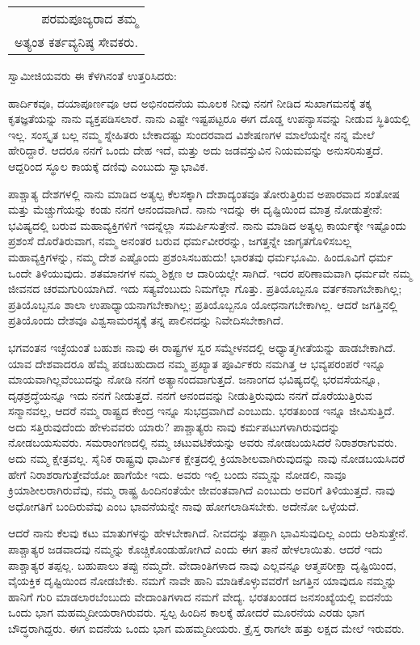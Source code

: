 \begin{longtable}[r]{@{}r@{}}
ಪರಮಪೂಜ್ಯರಾದ ತಮ್ಮ \\
ಅತ್ಯಂತ ಕರ್ತವ್ಯನಿಷ್ಠ ಸೇವಕರು. \\
\end{longtable}

ಸ್ವಾಮೀಜಿಯವರು ಈ ಕೆಳಗಿನಂತೆ ಉತ್ತರಿಸಿದರು:

ಹಾರ್ದಿಕವೂ, ದಯಾಪೂರ್ಣವೂ ಆದ ಅಭಿನಂದನೆಯ ಮೂಲಕ ನೀವು ನನಗೆ ನೀಡಿದ ಸುಖಾಗಮನಕ್ಕೆ ತಕ್ಕ ಕೃತಜ್ಞತೆಯನ್ನು ನಾನು ವ್ಯಕ್ತಪಡಿಸಲಾರೆ. ನಾನು ಎಷ್ಟೇ ಇಷ್ಟಪಟ್ಟರೂ ಈಗ ದೊಡ್ಡ ಉಪನ್ಯಾಸವನ್ನು ನೀಡುವ ಸ್ಥಿತಿಯಲ್ಲಿ ಇಲ್ಲ. ಸಂಸ್ಕೃತ ಬಲ್ಲ ನಮ್ಮ ಸ್ನೇಹಿತರು ಬೇಕಾದಷ್ಟು ಸುಂದರವಾದ ವಿಶೇಷಣಗಳ ಮಾಲೆಯನ್ನೇ ನನ್ನ ಮೇಲೆ ಹೇರಿದ್ದಾರೆ. ಆದರೂ ನನಗೆ ಒಂದು ದೇಹ ಇದೆ, ಮತ್ತು ಅದು ಜಡವಸ್ತುವಿನ ನಿಯಮವನ್ನು ಅನುಸರಿಸುತ್ತದೆ. ಆದ್ದರಿಂದ ಸ್ಥೂಲ ಕಾಯಕ್ಕೆ ದಣಿವು ಎಂಬುದು ಸ್ವಾಭಾವಿಕ. 

ಪಾಶ್ಚಾತ್ಯ ದೇಶಗಳಲ್ಲಿ ನಾನು ಮಾಡಿದ ಅತ್ಯಲ್ಪ ಕೆಲಸಕ್ಕಾಗಿ ದೇಶಾದ್ಯಂತವೂ ತೋರುತ್ತಿರುವ ಅಪಾರವಾದ ಸಂತೋಷ ಮತ್ತು ಮೆಚ್ಚುಗೆಯನ್ನು ಕಂಡು ನನಗೆ ಆನಂದವಾಗಿದೆ. ನಾನು ಇದನ್ನು ಈ ದೃಷ್ಟಿಯಿಂದ ಮಾತ್ರ ನೋಡುತ್ತೇನೆ: ಭವಿಷ್ಯದಲ್ಲಿ ಬರುವ ಮಹಾವ್ಯಕ್ತಿಗಳಿಗೆ ಇದನ್ನೆಲ್ಲಾ ಸಮರ್ಪಿಸುತ್ತೇನೆ. ನಾನು ಮಾಡಿದ ಅತ್ಯಲ್ಪ ಕಾರ್ಯಕ್ಕೇ ಇಷ್ಟೊಂದು ಪ್ರಶಂಸೆ ದೊರೆತಿರುವಾಗ, ನಮ್ಮ ಅನಂತರ ಬರುವ ಧರ್ಮವೀರರನ್ನು, ಜಗತ್ತನ್ನೇ ಜಾಗೃತಗೊಳಿಸಬಲ್ಲ ಮಹಾವ್ಯಕ್ತಿಗಳನ್ನು, ನಮ್ಮ ದೇಶ ಎಷ್ಟೊಂದು ಪ್ರಶಂಸಿಸಬಹುದು! ಭಾರತವು ಧರ್ಮಭೂಮಿ. ಹಿಂದೂವಿಗೆ ಧರ್ಮ ಒಂದೇ ತಿಳಿಯುವುದು. ಶತಮಾನಗಳ ನಮ್ಮ ಶಿಕ್ಷಣ ಆ ದಾರಿಯಲ್ಲೇ ಸಾಗಿದೆ. ಇದರ ಪರಿಣಾಮವಾಗಿ ಧರ್ಮವೇ ನಮ್ಮ ಜೀವನದ ಚರಮಗುರಿಯಾಗಿದೆ. ಇದು ಸತ್ಯವೆಂಬುದು ನಿಮಗೆಲ್ಲಾ ಗೊತ್ತು. ಪ್ರತಿಯೊಬ್ಬನೂ ವರ್ತಕನಾಗಬೇಕಾಗಿಲ್ಲ; ಪ್ರತಿಯೊಬ್ಬನೂ ಶಾಲಾ ಉಪಾಧ್ಯಾಯನಾಗಬೇಕಾಗಿಲ್ಲ; ಪ್ರತಿಯೊಬ್ಬನೂ ಯೋಧನಾಗಬೇಕಾಗಿಲ್ಲ. ಆದರೆ ಜಗತ್ತಿನಲ್ಲಿ ಪ್ರತಿಯೊಂದು ದೇಶವೂ ವಿಶ್ವಸಾಮರಸ್ಯಕ್ಕೆ ತನ್ನ ಪಾಲಿನದನ್ನು ನಿವೇದಿಸಬೇಕಾಗಿದೆ. 

ಭಗವಂತನ ಇಚ್ಛೆಯಂತೆ ಬಹುಶಃ ನಾವು ಈ ರಾಷ್ಟ್ರಗಳ ಸ್ವರ ಸಮ್ಮೇಳನದಲ್ಲಿ ಅಧ್ಯಾತ್ಮಗೀತೆಯನ್ನು ಹಾಡಬೇಕಾಗಿದೆ. ಯಾವ ದೇಶವಾದರೂ ಹೆಮ್ಮೆ ಪಡಬಹುದಾದ ನಮ್ಮ ಪ್ರಖ್ಯಾತ ಪೂರ್ವಿಕರು ನಮಗಿತ್ತ ಆ ಭವ್ಯಪರಂಪರೆ ಇನ್ನೂ ಮಾಯವಾಗಿಲ್ಲವೆಂಬುದನ್ನು ನೋಡಿ ನನಗೆ ಅತ್ಯಾನಂದವಾಗುತ್ತದೆ. ಜನಾಂಗದ ಭವಿಷ್ಯದಲ್ಲಿ ಭರವಸೆಯನ್ನೂ, ದೃಢಶ್ರದ್ಧೆಯನ್ನೂ ಇದು ನನಗೆ ನೀಡುತ್ತದೆ. ನನಗೆ ಆನಂದವನ್ನು ನೀಡುತ್ತಿರುವುದು ನನಗೆ ದೊರೆಯುತ್ತಿರುವ ಸನ್ಮಾನವಲ್ಲ, ಆದರೆ ನಮ್ಮ ರಾಷ್ಟ್ರದ ಕೇಂದ್ರ ಇನ್ನೂ ಸುಭದ್ರವಾಗಿದೆ ಎಂಬುದು. ಭರತಖಂಡ ಇನ್ನೂ ಜೀವಿಸುತ್ತಿದೆ. ಅದು ಸತ್ತಿರುವುದೆಂದು ಹೇಳುವವರು ಯಾರು? ಪಾಶ್ಚಾತ್ಯರು ನಾವು ಕರ್ಮಪಟುಗಳಾಗಿರುವುದನ್ನು ನೋಡಬಯಸುವರು. ಸಮರಾಂಗಣದಲ್ಲಿ ನಮ್ಮ ಚಟುವಟಿಕೆಯನ್ನು ಅವರು ನೋಡಬಯಸಿದರೆ ನಿರಾಶರಾಗುವರು. ಅದು ನಮ್ಮ ಕ್ಷೇತ್ರವಲ್ಲ. ಸೈನಿಕ ರಾಷ್ಟ್ರವು ಧಾರ್ಮಿಕ ಕ್ಷೇತ್ರದಲ್ಲಿ ಕ್ರಿಯಾಶೀಲವಾಗಿರುವುದನ್ನು ನಾವು ನೋಡಬಯಸಿದರೆ ಹೇಗೆ ನಿರಾಶರಾಗುತ್ತೇವೆಯೋ ಹಾಗೆಯೇ ಇದು. ಅವರು ಇಲ್ಲಿ ಬಂದು ನಮ್ಮನ್ನು ನೋಡಲಿ, ನಾವೂ ಕ್ರಿಯಾಶೀಲರಾಗಿರುವೆವು, ನಮ್ಮ ರಾಷ್ಟ್ರ ಹಿಂದಿನಂತೆಯೇ ಜೀವಂತವಾಗಿದೆ ಎಂಬುದು ಅವರಿಗೆ ತಿಳಿಯುತ್ತದೆ. ನಾವು ಅಧೋ\-ಗತಿಗೆ ಬಂದಿರುವೆವು ಎಂಬ ಭಾವನೆಯನ್ನೇ ನಾವು ಹೋಗಲಾಡಿಸಬೇಕು. ಅದೇನೋ ಒಳ್ಳೆಯದೆ. 

ಆದರೆ ನಾನು ಕೆಲವು ಕಟು ಮಾತುಗಳನ್ನು ಹೇಳಬೇಕಾಗಿದೆ. ನೀವದನ್ನು ತಪ್ಪಾಗಿ ಭಾವಿಸುವುದಿಲ್ಲ ಎಂದು ಆಶಿಸುತ್ತೇನೆ. ಪಾಶ್ಚಾತ್ಯರ ಜಡವಾದವು ನಮ್ಮನ್ನು ಕೊಚ್ಚಿಕೊಂಡುಹೋಗಿದೆ ಎಂದು ಈಗ ತಾನೆ ಹೇಳಲಾಯಿತು. ಆದರೆ ಇದು ಪಾಶ್ಚಾತ್ಯರ ತಪ್ಪಲ್ಲ. ಬಹುಪಾಲು ತಪ್ಪು ನಮ್ಮದೇ. ವೇದಾಂತಿಗಳಾದ ನಾವು ಎಲ್ಲವನ್ನೂ ಆತ್ಮಪರೀಕ್ಷಾ ದೃಷ್ಟಿಯಿಂದ, ವೈಯಕ್ತಿಕ ದೃಷ್ಟಿಯಿಂದ ನೋಡಬೇಕು. ನಮಗೆ ನಾವೇ ಹಾನಿ ಮಾಡಿಕೊಳ್ಳುವವರೆಗೆ ಜಗತ್ತಿನ ಯಾವುದೂ ನಮ್ಮನ್ನು ಹಾನಿಗೆ ಗುರಿ ಮಾಡಲಾರಬೆಂಬುದು ವೇದಾಂತಿಗಳಾದ ನಮಗೆ ವೇದ್ಯ. ಭರತಖಂಡದ ಜನಸಂಖ್ಯೆ\-ಯಲ್ಲಿ ಐದನೆಯ ಒಂದು ಭಾಗ ಮಹಮ್ಮದೀಯರಾಗಿರುವರು. ಸ್ವಲ್ಪ ಹಿಂದಿನ ಕಾಲಕ್ಕೆ ಹೋದರೆ ಮೂರನೆಯ ಎರಡು ಭಾಗ ಬೌದ್ಧರಾಗಿದ್ದರು. ಈಗ ಐದನೆಯ ಒಂದು ಭಾಗ ಮಹಮ್ಮದೀಯರು. ಕ್ರೈಸ್ತ ರಾಗಲೇ ಹತ್ತು ಲಕ್ಷದ ಮೇಲೆ ಇರುವರು. 

